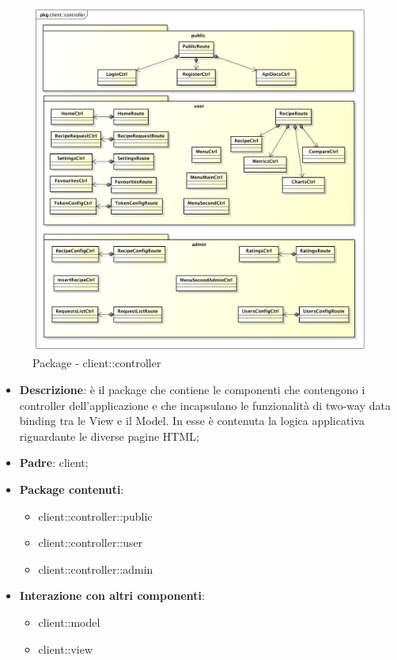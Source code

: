 \begin{figure}[htbp]
	\centering
	\centerline{\includegraphics[scale=0.4]{./images/client/client_controller.pdf}}
	\caption{Package - client::controller}
\end{figure}

\begin{itemize}
	\item \textbf{Descrizione}: è il package che contiene le componenti che contengono i controller dell'applicazione e che incapsulano le funzionalità di two-way data binding tra le View e il Model. In esse è contenuta la logica applicativa riguardante le diverse pagine HTML;
	\item \textbf{Padre}: client;
	\item \textbf{Package contenuti}:
		\begin{itemize}
			\item client::controller::public
			\item client::controller::user
			\item client::controller::admin
		\end{itemize}
	\item \textbf{Interazione con altri componenti}:
		\begin{itemize}
			\item client::model
			\item client::view
		\end{itemize}
\end{itemize}



